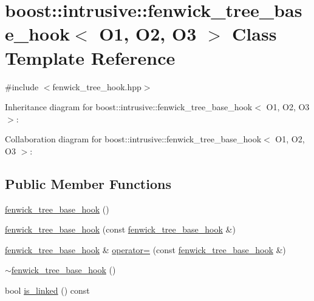 \hypertarget{classboost_1_1intrusive_1_1fenwick__tree__base__hook}{}\section{boost\+:\+:intrusive\+:\+:fenwick\+\_\+tree\+\_\+base\+\_\+hook$<$ O1, O2, O3 $>$ Class Template Reference}
\label{classboost_1_1intrusive_1_1fenwick__tree__base__hook}


{\ttfamily \#include $<$fenwick\+\_\+tree\+\_\+hook.\+hpp$>$}



Inheritance diagram for boost\+:\+:intrusive\+:\+:fenwick\+\_\+tree\+\_\+base\+\_\+hook$<$ O1, O2, O3 $>$\+:


Collaboration diagram for boost\+:\+:intrusive\+:\+:fenwick\+\_\+tree\+\_\+base\+\_\+hook$<$ O1, O2, O3 $>$\+:
\subsection*{Public Member Functions}
\begin{DoxyCompactItemize}
\item 
\hyperlink{classboost_1_1intrusive_1_1fenwick__tree__base__hook_aed0cc7d4589c9ba81d2b0024ba0072b3}{fenwick\+\_\+tree\+\_\+base\+\_\+hook} ()
\item 
\hyperlink{classboost_1_1intrusive_1_1fenwick__tree__base__hook_ace166089f548cd53aa77dfef98f7ab0e}{fenwick\+\_\+tree\+\_\+base\+\_\+hook} (const \hyperlink{classboost_1_1intrusive_1_1fenwick__tree__base__hook}{fenwick\+\_\+tree\+\_\+base\+\_\+hook} \&)
\item 
\hyperlink{classboost_1_1intrusive_1_1fenwick__tree__base__hook}{fenwick\+\_\+tree\+\_\+base\+\_\+hook} \& \hyperlink{classboost_1_1intrusive_1_1fenwick__tree__base__hook_a57b63d8ace2bc5a3c6a74c580ffb859d}{operator=} (const \hyperlink{classboost_1_1intrusive_1_1fenwick__tree__base__hook}{fenwick\+\_\+tree\+\_\+base\+\_\+hook} \&)
\item 
\hyperlink{classboost_1_1intrusive_1_1fenwick__tree__base__hook_ac723f9207f2c9f6a31fb2b22ad01c470}{$\sim$fenwick\+\_\+tree\+\_\+base\+\_\+hook} ()
\item 
bool \hyperlink{classboost_1_1intrusive_1_1fenwick__tree__base__hook_a87d1e5ed95133ffdc1b2bde6d143545b}{is\+\_\+linked} () const
\end{DoxyCompactItemize}


